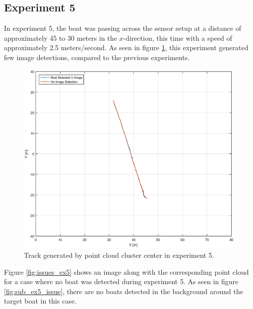 \subsection{Experiment 5}
In experiment 5, the boat was passing across the sensor setup at a distance of approximately 45 to 30 meters in the $x$-direction, this time with a speed of approximately 2.5 meters/second. As seen in figure \ref{fig:ex5_track}, this experiment generated few image detections, compared to the previous experiments.
\begin{figure}[H]
	\centering
	\includegraphics[width=.8\linewidth]{fig/exp_5_track.eps}
	\caption{Track generated by point cloud cluster center in experiment 5.}
	\label{fig:ex5_track}
\end{figure}
Figure \ref{fig:issues_ex5} shows an image along with the corresponding point cloud for a case where no boat was detected during experiment 5. As seen in figure \ref{fig:sub_ex5_issue}, there are no boats detected in the background around the target boat in this case. 
